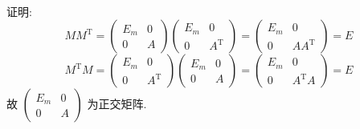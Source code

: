 	 \paragraph{} %
		 证明:
		 \[MM^{\mathrm{T}} = \begin{pmatrix}
				 E_m & 0 \\
				 0   & A
			 \end{pmatrix}
			 \begin{pmatrix}
				 E_m & 0              \\
				 0   & A^{\mathrm{T}}
			 \end{pmatrix} = \begin{pmatrix}
				 E_m & 0               \\
				 0   & AA^{\mathrm{T}}
			 \end{pmatrix} = E\]
		 \[M^{\mathrm{T}} M = \begin{pmatrix}
				 E_m & 0              \\
				 0   & A^{\mathrm{T}}
			 \end{pmatrix}
			 \begin{pmatrix}
				 E_m & 0 \\
				 0   & A
			 \end{pmatrix} = \begin{pmatrix}
				 E_m & 0                \\
				 0   & A^{\mathrm{T}} A
			 \end{pmatrix} = E\]
		 故 $\begin{pmatrix}
				 E_m & 0 \\
				 0   & A
			 \end{pmatrix}$ 为正交矩阵.


 \subsection{} %


